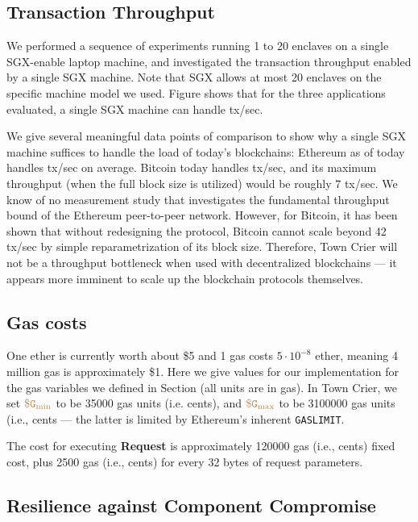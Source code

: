 \subsection{Transaction Throughput}
We performed a sequence of experiments running 1 to 20 enclaves 
on a single SGX-enable laptop
machine, and investigated the transaction throughput 
enabled by a single SGX machine. 
Note that SGX allows at most 20 enclaves on the specific machine model we used.
Figure  
shows that for the three applications evaluated,
a single SGX machine can handle
tx/sec.

We give several meaningful data points of comparison to show
why a single SGX machine suffices to handle the load of
today's blockchains: 
Ethereum as of today handles 
 tx/sec on average. 
Bitcoin today handles
 tx/sec, and 
its maximum throughput (when the full block size is utilized)
would be roughly 7 tx/sec.
We know of no measurement study that 
investigates the fundamental 
throughput bound of the Ethereum  peer-to-peer network.
However, for Bitcoin, it has been shown that without
redesigning the protocol, 
Bitcoin cannot scale beyond  
42 tx/sec by simple reparametrization of its block size.
Therefore, Town Crier will not be a throughput 
bottleneck when used 
with decentralized blockchains --- it appears 
more imminent to scale up 
the blockchain protocols themselves.

\subsection{Gas costs}
One ether is currently worth about \$5 and 1 gas costs $5 \cdot 10^{-8}$ ether, meaning 4 million gas is approximately \$1.
Here we give values for our implementation for the gas variables we defined in Section  (all units are in gas).
In Town Crier, we set $\tt {\color{brown} \$G_\text{min} }$ to be 35000 gas units (i.e.   cents),
and $\tt {\color{brown} \$G_\text{max} }$ to be 3100000 gas units (i.e.,  cents --- the latter is limited by 
Ethereum's inherent {\tt GASLIMIT}.

The cost for executing {\bf Request} is approximately \num[group-separator={,}]{120000} 
gas (i.e.,  cents) 
fixed cost, 
plus \num[group-separator={,}]{2500} gas (i.e.,  cents) 
for every 32 bytes of request parameters.


\subsection{Resilience against Component Compromise}

